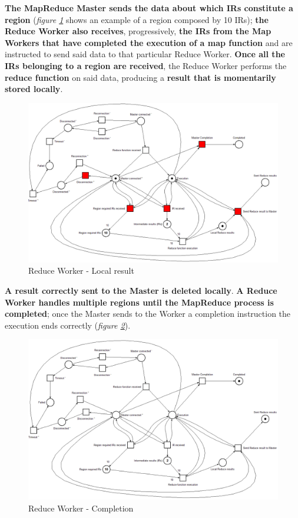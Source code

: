 \textbf{The MapReduce Master sends the data about which IRs constitute a region} (\textit{figure \ref{fig:reduce_worker_petri_net_1}} shows an example of a region composed by 10 IRs); \textbf{the Reduce Worker also receives}, progressively, \textbf{the IRs from the Map Workers that have completed the execution of a map function} and are instructed to send said data to that particular Reduce Worker. \textbf{Once all the IRs belonging to a region are received}, the Reduce Worker performs the \textbf{reduce function} on said data, producing a \textbf{result that is momentarily stored locally}.

\begin{figure}[!ht]
    \centering
    \includegraphics[scale=0.44]{document/chapters/chapter_5/images/reduce_worker_petri_net_1.png}
    \caption{Reduce Worker - Local result}
    \label{fig:reduce_worker_petri_net_1}
\end{figure}

\textbf{A result correctly sent to the Master is deleted locally}. \textbf{A Reduce Worker handles multiple regions until the MapReduce process is completed}; once the Master sends to the Worker a completion instruction the execution ends correctly (\textit{figure \ref{fig:reduce_worker_petri_net_2}}).

\begin{figure}[!ht]
    \centering
    \includegraphics[scale=0.44]{document/chapters/chapter_5/images/reduce_worker_petri_net_2.png}
    \caption{Reduce Worker - Completion}
    \label{fig:reduce_worker_petri_net_2}
\end{figure}

